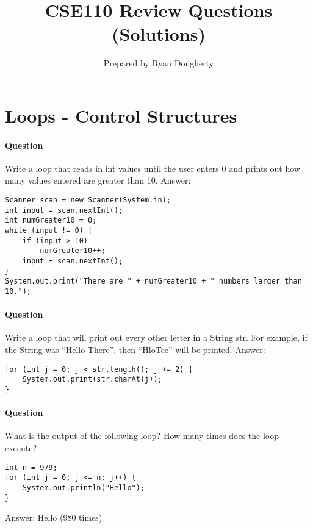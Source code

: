 \documentclass{article}
\title{CSE110 Review Questions (Solutions)}
\author{Prepared by Ryan Dougherty}
\date{}
\begin{document}
\maketitle

\section{Loops - Control Structures}


\setcounter{question_num}{1}
\paragraph{Question }
Write a loop that reads in int values until the user enters 0 and prints out how many values entered are greater than 10.
\newline
{\color{red}Answer:}
\begin{lstlisting}
Scanner scan = new Scanner(System.in);
int input = scan.nextInt();
int numGreater10 = 0;
while (input != 0) {
	if (input > 10)
		numGreater10++;
	input = scan.nextInt();
}
System.out.print("There are " + numGreater10 + " numbers larger than 10.");
\end{lstlisting}

\addtocounter{question_num}{1}
\paragraph{Question }
Write a loop that will print out every other letter in a String str. For example, if the String was \enquote{Hello There}, then \enquote{HloTee} will be printed.
\newline
{\color{red}Answer:}
\begin{lstlisting}
for (int j = 0; j < str.length(); j += 2) {
	System.out.print(str.charAt(j));
}
\end{lstlisting}

\addtocounter{question_num}{1}
\paragraph{Question }
What is the output of the following loop? How many times does the loop execute?
\begin{lstlisting}
int n = 979;
for (int j = 0; j <= n; j++) {
	System.out.println("Hello");
}
\end{lstlisting}
{\color{red}Answer: Hello (980 times)}
\end{document}
